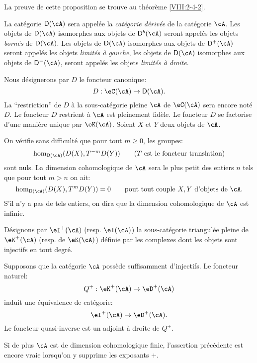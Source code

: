 La preuve de cette proposition se trouve au th\'eor\`eme \ref{VIII:2-4-2}. 





\begin{definition}\label{VIII:3-1-3}
La cat\'egorie $\D(\cA)$ sera appel\'ee la \emph{cat\'egorie d\'eriv\'ee} de la 
cat\'egorie $\cA$. Les objets de $\D(\cA)$ isomorphes aux objets de $\D^b(\cA)$ 
seront appel\'es les objets \emph{born\'es} de $\D(\cA)$. Les objets de 
$\D(\cA)$ isomorphes aux objets de $\D^+(\cA)$ seront appel\'es les objets 
\emph{limit\'es \`a gauche}, les objets de $\D(\cA)$ isomorphes aux objets de 
$\D^-(\cA)$, seront appel\'es les objets \emph{limit\'es \`a droite}. 
\end{definition}

Nous d\'esignerons par $D$ le foncteur canonique: 
\[
  D : \eC(\cA) \to \D(\cA) \text{.}
\]
La ``restriction'' de $D$ \`a la sous-cat\'egorie pleine $\cA$ de $\eC(\cA)$ 
sera encore not\'e $D$. Le foncteur $D$ restrient \`a $\cA$ est pleinement 
fid\`ele. Le foncteur $D$ se factorise d'une mani\`ere unique par $\eK(\cA)$. 
Soient $X$ et $Y$ deux objets de $\cA$. 

On v\'erifie sans difficult\'e que pour tout $m\geqslant 0$, les groupes: 
\[
  \hom_{\D(\cA)}(D(X),T^{-m} D(Y)) \qquad \text{($T$ est le foncteur translation)} 
\]
sont nuls. La dimension cohomologique de $\cA$ sera le plus petit des entiers 
$n$ tels que pour tout $m>n$ on ait: 
\[
  \hom_{\D(\cA)}(D(X),T^m D(Y)) = 0 \qquad\text{pout tout couple $X,Y$ d'objets de $\cA$.} 
\]
S'il n'y a pas de tels entiers, on dira que la dimension cohomologique de $\cA$ 
est infinie. 

D\'esignons par $\eI^+(\cA)$ (resp. $\eI(\cA)$) la sous-cat\'egorie triangul\'ee 
pleine de $\eK^+(\cA)$ (resp. de $\eK(\cA)$) d\'efinie par les complexes dont 
les objets sont injectifs en tout degr\'e. 





\begin{proposition}\label{VIII:3-1-4}
Supposons que la cat\'egorie $\cA$ poss\`ede suffisamment d'injectifs. Le 
foncteur naturel: 
\[
  Q^+:\eK^+(\cA) \to \eD^+(\cA) 
\]
induit une \'equivalence de cat\'egorie: 
\[
  \eI^+(\cA) \to \eD^+(\cA)  \text{.}
\]
Le foncteur quasi-inverse est un adjoint \`a droite de $Q^+$. 
\end{proposition}

Si de plus $\cA$ est de dimension cohomologique finie, l'assertion 
pr\'ec\'edente est encore vraie lorsqu'on y supprime les exposants $+$. 

